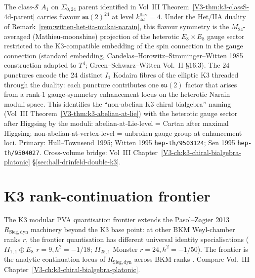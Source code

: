 \begin{remark}
\label{rem:witten-e8-e8-flavour-structure}
%
The class-$\mathcal{S}$ $A_{1}$ on $\Sigma_{0,24}$ parent identified in
Vol~III Theorem~\ref*{V3-thm:k3-classS-4d-parent} carries flavour
$\mathfrak{su}(2)^{24}$ at level $k_{4d}^{\mathrm{flav}} = 4$. Under the
Het/IIA duality of Remark~\ref{rem:witten-het-iia-mukai-narain}, this
flavour symmetry is the $M_{24}$-averaged (Mathieu-moonshine) projection
of the heterotic $E_{8} \times E_{8}$ gauge sector restricted to the
K3-compatible embedding of the spin connection in the gauge connection
(standard embedding, Candelas--Horowitz--Strominger--Witten 1985
construction adapted to $T^{4}$; Green--Schwarz--Witten Vol.~II \S16.3).
The $24$ punctures encode the $24$ distinct $I_{1}$ Kodaira fibres of the
elliptic K3 threaded through the duality: each puncture contributes one
$\mathfrak{su}(2)$ factor that arises from a rank-$1$ gauge-symmetry
enhancement locus on the heterotic Narain moduli space. This identifies
the ``non-abelian K3 chiral bialgebra'' naming (Vol~III
Theorem~\ref*{V3-thm:k3-abelian-at-lie}) with the heterotic gauge sector
after Higgsing by the moduli: abelian-at-Lie-level = Cartan after
maximal Higgsing; non-abelian-at-vertex-level = unbroken gauge group at
enhancement loci. Primary: Hull--Townsend 1995; Witten 1995
\texttt{hep-th/9503124}; Sen 1995 \texttt{hep-th/9504027}. Cross-volume
bridge: Vol~III Chapter~\ref*{V3-ch:k3-chiral-bialgebra-platonic}
\S\ref*{sec:hall-drinfeld-double-k3}.
\end{remark}

\section{K3 rank-continuation frontier}
\label{sec:mpvaqf-supplement}

\begin{remark}
\label{rem:mpvaqf-1}
The K3 modular PVA quantisation frontier extends the Pasol--Zagier
2013 $R_{\mathrm{Sieg,dyn}}$ machinery beyond the K3 base point: at
other BKM Weyl-chamber ranks $r$, the frontier quantisation has
different universal identity specialisations ($II_{1,1}\oplus E_8$
$r=9, \hbar^2=-1/18$; $II_{25,1}$ Monster $r=24, \hbar^2=-1/50$). The
frontier is the analytic-continuation locus of $R_{\mathrm{Sieg,dyn}}$
across BKM ranks \cite{PasolZagier2013,Borcherds1998}. Compare
Vol.~III Chapter~\ref{V3-ch:k3-chiral-bialgebra-platonic}.
\end{remark}
